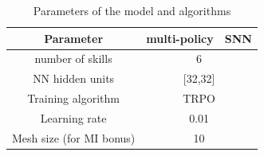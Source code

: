 \documentclass{article} %
\begin{document}
\begin{table}[h!]
\centering
\begin{tabular}[t]{c|cc}
Parameter & multi-policy & SNN \\
\hline
number of skills & \multicolumn{2}{c}{6}\\
NN hidden units & \multicolumn{2}{c}{[32,32]}\\
Training algorithm & \multicolumn{2}{c}{TRPO}\\
Learning rate & \multicolumn{2}{c}{0.01}\\
Mesh size (for MI bonus)& \multicolumn{2}{c}{10}
\end{tabular}
\caption{Parameters of the model and algorithms}
\label{tab:params}
\end{table}
\end{document}
